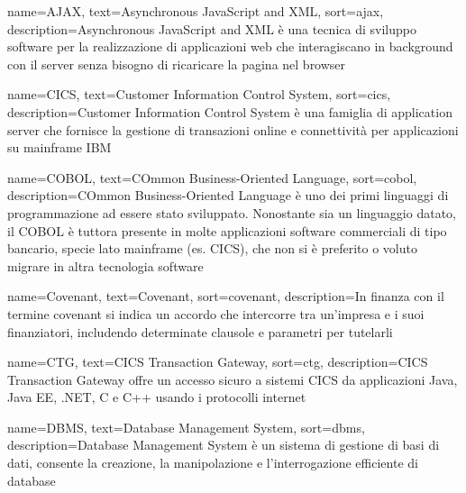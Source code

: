 
%
%


{
    name=AJAX,
    text=Asynchronous JavaScript and XML,
    sort=ajax,
    description={Asynchronous JavaScript and XML è una tecnica di sviluppo software per la realizzazione di applicazioni web che interagiscano in background con il server senza bisogno di ricaricare la pagina nel browser}
}

{
    name=CICS,
    text=Customer Information Control System,
    sort=cics,
    description={Customer Information Control System è una famiglia di application server che fornisce la gestione di transazioni online e connettività per applicazioni su mainframe IBM}
}

{
    name=COBOL,
    text=COmmon Business-Oriented Language,
    sort=cobol,
    description={COmmon Business-Oriented Language è uno dei primi linguaggi di programmazione ad essere stato sviluppato. Nonostante sia un linguaggio datato, il COBOL è tuttora presente in molte applicazioni software commerciali di tipo bancario, specie lato mainframe (es. CICS), che non si è preferito o voluto migrare in altra tecnologia software}
}

{
    name=Covenant,
    text=Covenant,
    sort=covenant,
    description={In finanza con il termine covenant si indica un accordo che intercorre tra un'impresa e i suoi finanziatori, includendo determinate clausole e parametri per tutelarli}
}

{
    name=CTG,
    text=CICS Transaction Gateway,
    sort=ctg,
    description={CICS Transaction Gateway offre un accesso sicuro a sistemi CICS da applicazioni Java, Java EE, .NET, C e C++ usando i protocolli internet}
}
 
{
    name=DBMS,
    text=Database Management System,
    sort=dbms,
    description={Database Management System è un sistema di gestione di basi di dati, consente la creazione, la manipolazione e l’interrogazione efficiente di database}
}

